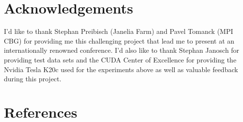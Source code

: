 \documentclass [a4paper,12pt]{article}
\begin{document}
\section{Acknowledgements}
\label{sec:ackn}

I'd like to thank Stephan Preibisch (Janelia Farm) and Pavel Tomanck (MPI CBG) for providing me this challenging project that lead me to present at an internationally renowned conference. I'd also like to thank Stephan Janosch for providing test data sets and the CUDA Center of Excellence for providing the Nvidia Tesla K20c used for the experiments above as well as valuable feedback during this project. 

\section{References}


\end{document}
